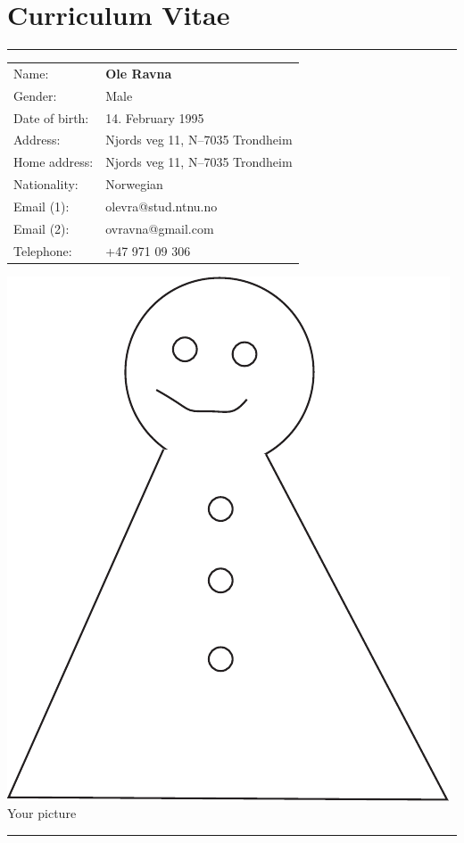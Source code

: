 
\chapter*{Curriculum Vitae}
\hrule
\begin{minipage}[t]{0.65\linewidth}
\begin{tabular}{ll}
Name: & \textbf{Ole Ravna}\\
Gender: & Male\\
Date of birth: & 14. February 1995\\
Address: & Njords veg 11, N--7035 Trondheim \\
Home address: & Njords veg 11, N--7035 Trondheim \\
Nationality:    & Norwegian \\
Email (1): & olevra@stud.ntnu.no\\
Email (2): & ovravna@gmail.com\\
Telephone: & +47 971 09 306\\
\end{tabular} 
\end{minipage}\hfill
\begin{minipage}[t]{0.25\linewidth}
\includegraphics[scale=0.3]{fig/me}\\[1pc] Your picture
\end{minipage}
\hrule

